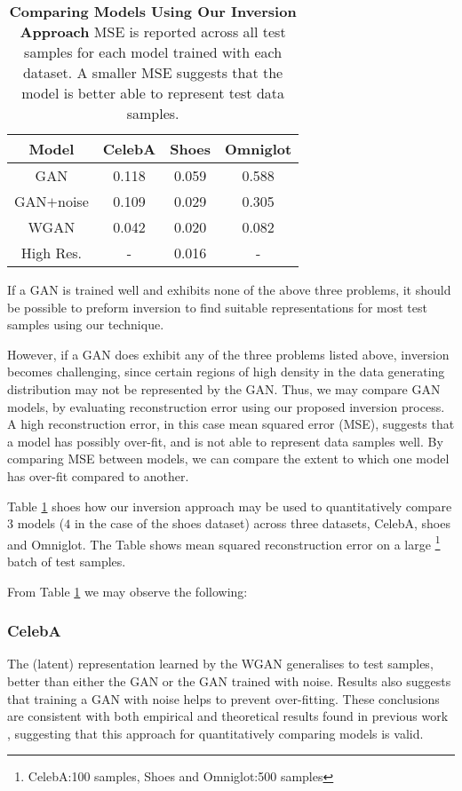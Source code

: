 \documentclass[journal]{IEEEtran}
\begin{document}
\begin{table}[h!]
    \centering
    \caption{\textbf{Comparing Models Using Our Inversion Approach} MSE is reported across all test samples for each model trained with each dataset. A smaller MSE suggests that the model is better able to represent test data samples.}
    \label{tab:compare}
    \begin{tabular}{c c c c}
        \textbf{Model}  & CelebA & Shoes & Omniglot\\ \toprule 
        GAN \cite{radford2015unsupervised} & 0.118 & 0.059 & 0.588\\
        GAN$+$noise \cite{arjovsky2017towards} & 0.109 & 0.029 & 0.305\\
        WGAN \cite{arjovsky2017wasserstein} & 0.042 &  0.020 & 0.082\\ \hdashline[1pt/5pt]
        High Res. & -  & 0.016 & - \\ \bottomrule
    \end{tabular}
\end{table}

If a GAN is trained well and exhibits none of the above three problems, it should be possible to preform inversion to find suitable representations for most test samples using our technique.

However, if a GAN does exhibit any of the three problems listed above, inversion becomes challenging, since certain regions of high density in the data generating distribution may not be represented by the GAN. Thus, we may compare GAN models, by evaluating reconstruction error using our proposed inversion process. A high reconstruction error, in this case mean squared error (MSE), suggests that a model has possibly over-fit, and is not able to represent data samples well. By comparing MSE between models, we can compare the extent to which one model has over-fit compared to another. 

Table \ref{tab:compare} shoes how our inversion approach may be used to quantitatively compare $3$ models ($4$ in the case of the shoes dataset) across three datasets, CelebA, shoes and Omniglot. The Table shows mean squared reconstruction error on a large \footnote{CelebA:100 samples, Shoes and Omniglot:500 samples} batch of test samples.

From Table \ref{tab:compare} we may observe the following:

\subsubsection{CelebA}
The (latent) representation learned by the WGAN generalises to test samples, better than either the GAN or the GAN trained with noise. Results also suggests that training a GAN with noise helps to prevent over-fitting. These conclusions are consistent with both empirical and theoretical results found in previous work \cite{arjovsky2017wasserstein, arjovsky2017towards}, suggesting that this approach for quantitatively comparing models is valid.
\end{document}
